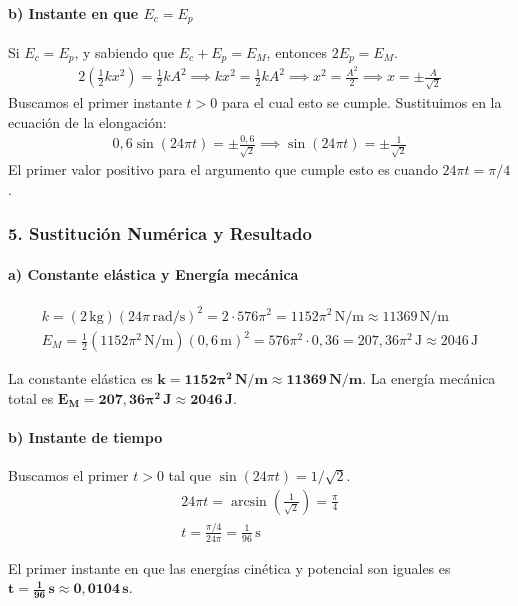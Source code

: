 \paragraph{b) Instante en que $E_c = E_p$}
Si $E_c = E_p$, y sabiendo que $E_c + E_p = E_M$, entonces $2E_p = E_M$.
\begin{gather}
    2 \left( \frac{1}{2}kx^2 \right) = \frac{1}{2}kA^2 \implies kx^2 = \frac{1}{2}kA^2 \implies x^2 = \frac{A^2}{2} \implies x = \pm \frac{A}{\sqrt{2}}
\end{gather}
Buscamos el primer instante $t>0$ para el cual esto se cumple. Sustituimos en la ecuación de la elongación:
\begin{gather}
    0,6\sin(24\pi t) = \pm \frac{0,6}{\sqrt{2}} \implies \sin(24\pi t) = \pm \frac{1}{\sqrt{2}}
\end{gather}
El primer valor positivo para el argumento que cumple esto es cuando $24\pi t = \pi/4$.

\subsubsection*{5. Sustitución Numérica y Resultado}
\paragraph{a) Constante elástica y Energía mecánica}
\begin{gather}
    k = (2 \, \text{kg})(24\pi \, \text{rad/s})^2 = 2 \cdot 576\pi^2 = 1152\pi^2 \, \text{N/m} \approx 11369 \, \text{N/m} \\
    E_M = \frac{1}{2}(1152\pi^2 \, \text{N/m})(0,6 \, \text{m})^2 = 576\pi^2 \cdot 0,36 = 207,36\pi^2 \, \text{J} \approx 2046 \, \text{J}
\end{gather}
\begin{cajaresultado}
    La constante elástica es $\boldsymbol{k = 1152\pi^2 \, \textbf{N/m} \approx 11369 \, \textbf{N/m}}$. La energía mecánica total es $\boldsymbol{E_M = 207,36\pi^2 \, \textbf{J} \approx 2046 \, \textbf{J}}$.
\end{cajaresultado}

\paragraph{b) Instante de tiempo}
Buscamos el primer $t>0$ tal que $\sin(24\pi t) = 1/\sqrt{2}$.
\begin{gather}
    24\pi t = \arcsin\left(\frac{1}{\sqrt{2}}\right) = \frac{\pi}{4} \\
    t = \frac{\pi/4}{24\pi} = \frac{1}{96} \, \text{s}
\end{gather}
\begin{cajaresultado}
    El primer instante en que las energías cinética y potencial son iguales es $\boldsymbol{t = \frac{1}{96} \, \textbf{s} \approx 0,0104 \, \textbf{s}}$.
\end{cajaresultado}

